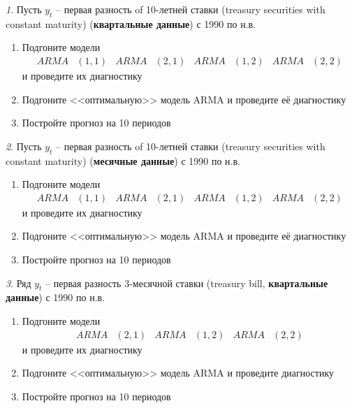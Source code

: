 \documentclass[12pt]{article}
\theoremstyle{remark}
\newtheorem{exercise}{}[subsection]
\begin{document}
\begin{exercise}
Пусть \(y_t\) -- первая разность of 10-летней ставки (treasury securities  with constant maturity) 
(\textbf{квартальные данные}) с 1990 по н.в.
\begin{enumerate}
	\item Подгоните модели
	\begin{align*}
		ARMA&(1,1) & ARMA&(2,1) & ARMA&(1,2) & ARMA&(2,2)
	\end{align*} 
	и проведите их диагностику
	\item Подгоните <<оптимальную>> модель ARMA и проведите её диагностику
	\item Постройте прогноз на 10 периодов
\end{enumerate}
\end{exercise}

\begin{exercise}
Пусть \(y_t\) -- первая разность of 10-летней ставки (treasury securities  with constant maturity) 
(\textbf{месячные данные}) с 1990 по н.в.
\begin{enumerate}
	\item Подгоните модели
	\begin{align*}
		ARMA&(1,1) & ARMA&(2,1) & ARMA&(1,2) & ARMA&(2,2)
	\end{align*} 
	и проведите их диагностику
	\item Подгоните <<оптимальную>> модель ARMA и проведите её диагностику
	\item Постройте прогноз на 10 периодов
\end{enumerate}
\end{exercise}

\begin{exercise}
Ряд \(y_t\) -- первая разность 3-месячной ставки (treasury bill, 
\textbf{квартальные данные}) с 1990 по н.в.
\begin{enumerate}
	\item Подгоните модели
	\begin{align*}
		ARMA&(2,1) & ARMA&(1,2) & ARMA&(2,2)
	\end{align*} 
	и проведите их диагностику
	\item Подгоните <<оптимальную>> модель ARMA и проведите диагностику
	\item Постройте прогноз на 10 периодов
\end{enumerate}
\end{exercise}
\end{document}
